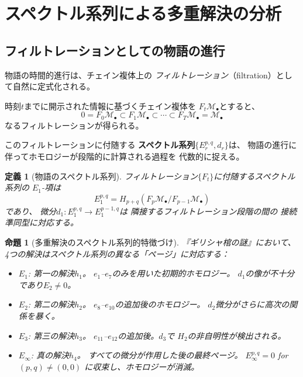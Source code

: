 \documentclass[12pt,twocolumn]{ltjsarticle}
\newtheorem{proposition}[theorem]{命題}
\newtheorem{definition}[theorem]{定義}
\newcommand{\Mys}{\mathcal{M}}
\begin{document}
\section{スペクトル系列による多重解決の分析}
\label{sec:spectral}

\subsection{フィルトレーションとしての物語の進行}

物語の時間的進行は、チェイン複体上の
\emph{フィルトレーション}（filtration）として自然に定式化される。

時刻$t$までに開示された情報に基づくチェイン複体を
$F_t \Mys_\bullet$とすると、
\begin{equation}
0 = F_0 \Mys_\bullet \subset F_1 \Mys_\bullet \subset \cdots
\subset F_T \Mys_\bullet = \Mys_\bullet
\end{equation}
なるフィルトレーションが得られる。

このフィルトレーションに付随する
\textbf{スペクトル系列}$\{E_r^{p,q}, d_r\}$は、
物語の進行に伴ってホモロジーが段階的に計算される過程を
代数的に捉える。

\begin{definition}[物語のスペクトル系列]
フィルトレーション$\{F_t\}$に付随するスペクトル系列の
$E_1$-項は
\begin{equation}
E_1^{p,q} = H_{p+q}(F_p \Mys_\bullet / F_{p-1} \Mys_\bullet)
\end{equation}
であり、
微分$d_1: E_1^{p,q} \to E_1^{p-1,q}$は
隣接するフィルトレーション段階の間の
接続準同型に対応する。
\end{definition}

\begin{proposition}[多重解決のスペクトル系列的特徴づけ]
\label{prop:spectral_solutions}
『ギリシャ棺の謎』において、
4つの解決はスペクトル系列の異なる「ページ」に対応する：
\begin{itemize}
\item $E_1$: 第一の解決$h_1$。
  $e_1$--$e_7$のみを用いた初期的ホモロジー。
  $d_1$の像が不十分であり$E_2 \neq 0$。

\item $E_2$: 第二の解決$h_2$。
  $e_8$--$e_{10}$の追加後のホモロジー。
  $d_2$微分がさらに高次の関係を暴く。

\item $E_3$: 第三の解決$h_3$。
  $e_{11}$--$e_{12}$の追加後。$d_3$で
  $H_2$の非自明性が検出される。

\item $E_\infty$: 真の解決$h_4$。
  すべての微分が作用した後の最終ページ。
  $E_\infty^{p,q} = 0$ for $(p,q) \neq (0,0)$
  に収束し、ホモロジーが消滅。
\end{itemize}
\end{proposition}
\end{document}
